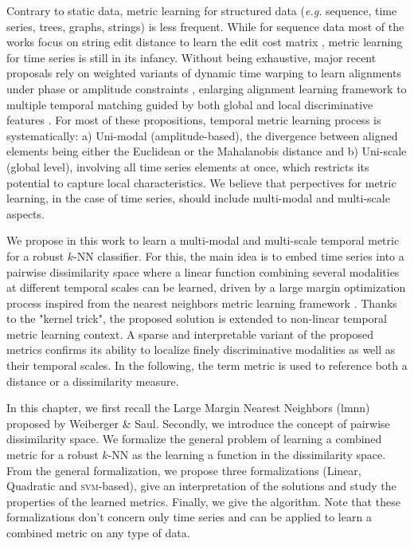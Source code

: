 Contrary to static data, metric learning for structured data (\textit{e.g.} sequence, time series, trees, graphs, strings) is less frequent. While for sequence data most of the works focus on string edit distance to learn the edit cost matrix \cite{Oncina2006,Bellet2012}, metric learning for time series is still in its infancy. Without being exhaustive, major recent proposals rely on weighted variants of dynamic time warping to learn alignments under phase or amplitude constraints \cite{Reyes2011,Jeong2011,ZhangX.-L.Z.-G.Luo2014}, enlarging alignment learning framework to multiple temporal matching guided by both global and local discriminative features \cite{Frambourg2013a}. For most of these propositions, temporal metric learning process is systematically: a) Uni-modal (amplitude-based), the divergence between aligned elements being either the Euclidean or the Mahalanobis distance and b) Uni-scale (global level), involving all time series elements at once, which restricts its potential to capture local characteristics. We believe that perpectives for metric learning, in the case of time series, should include multi-modal and multi-scale aspects.

We propose in this work to learn a multi-modal and multi-scale temporal metric for a robust $k$-NN classifier. For this, the main idea is to embed time series into a pairwise dissimilarity space where a linear function combining several modalities at different temporal scales can be learned, driven by a large margin optimization process inspired from the nearest neighbors metric learning framework \cite{Weinberger2009a}. Thanks to the "kernel trick", the proposed solution is extended to non-linear temporal metric learning context. A sparse and interpretable variant of the proposed metrics confirms its ability to localize finely discriminative modalities as well as their temporal scales. In the following, the term metric is used to reference both a distance or a dissimilarity measure.

In this chapter, we first recall the Large Margin Nearest Neighbors ({\sc lmnn}) proposed by Weiberger \& Saul. Secondly, we introduce the concept of pairwise dissimilarity space. We formalize the general problem of learning a combined metric for a robust $k$-NN as the learning a function in the dissimilarity space. From the general formalization, we propose three formalizations (Linear, Quadratic and \textsc{svm}-based), give an interpretation of the solutions and study the properties of the learned metrics. Finally, we give the algorithm. Note that these formalizations don't concern only time series and can be applied to learn a combined metric on any type of data. 


